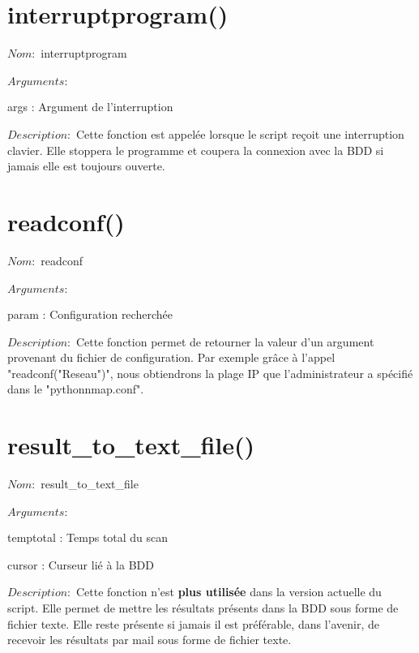 \documentclass[12pt]{report}
\begin{document}
		\section{interruptprogram()}
			{\setlength{\parindent}{0cm}
			$Nom :$ interruptprogram\\\\
			}
			$Arguments :$
			\begin{description}
				\item *args : Argument de l'interruption\\
			\end{description}
			$Description : $ Cette fonction est appelée lorsque le script reçoit une interruption clavier. Elle stoppera le programme et coupera la connexion avec la BDD si jamais elle est toujours ouverte.
		\section{readconf()}
			{\setlength{\parindent}{0cm}
			$Nom :$ readconf\\\\
			}
			$Arguments :$
			\begin{description}
				\item param : Configuration recherchée\\
			\end{description}
			$Description : $ Cette fonction permet de retourner la valeur d'un argument provenant du fichier de configuration. Par exemple grâce à l'appel "readconf("Reseau")", nous obtiendrons la plage IP que l'administrateur a spécifié dans le "pythonnmap.conf".
		\section{result\_to\_text\_file()}
			{\setlength{\parindent}{0cm}
			$Nom :$ result\_to\_text\_file\\\\
			}
			$Arguments :$
			\begin{description}
				\item temptotal : Temps total du scan
				\item cursor : Curseur lié à la BDD\\
			\end{description}
			$Description : $ Cette fonction n'est \textbf{plus utilisée} dans la version actuelle du script. Elle permet de mettre les résultats présents dans la BDD sous forme de fichier texte. Elle reste présente si jamais il est préférable, dans l'avenir, de recevoir les résultats par mail sous forme de fichier texte.
\end{document}
